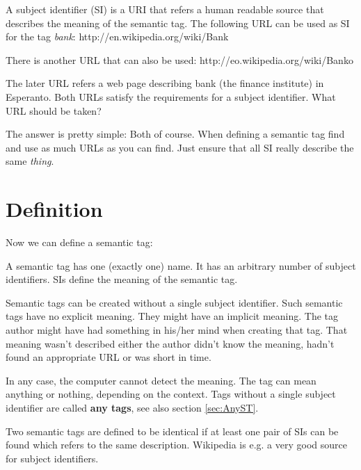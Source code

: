 A subject identifier (SI) is a URI that refers a human readable source that describes the meaning of the semantic tag. The following URL can be used as SI for the tag {\it bank}: http://en.wikipedia.org/wiki/Bank

There is another URL that can also be used:
http://eo.wikipedia.org/wiki/Banko

The later URL refers a web page describing bank (the finance institute) in Esperanto. Both URLs satisfy the requirements for a subject identifier. What URL should be taken?

The answer is pretty simple: Both of course. When defining a semantic tag find and use as much URLs as you can find. Just ensure that all SI really describe the same {\it thing}.

\section{Definition}
Now we can define a semantic tag:

A semantic tag has one (exactly one) name. It has an arbitrary number of subject identifiers. SIs define the meaning of the semantic tag. 

Semantic tags can be created without a single subject identifier. Such semantic tags have no explicit meaning. They might have an implicit meaning. The tag author might have had something in his/her mind when creating that tag. That meaning wasn't described either the author didn't know the meaning, hadn't found an appropriate URL or was short in time.

In any case, the computer cannot detect the meaning. The tag can mean anything or nothing, depending on the context. Tags without a single subject identifier are called {\bf any tags}, see also section \ref{sec:AnyST}.

Two semantic tags are defined to be identical if at least one pair of SIs can be found which refers to the same description. Wikipedia is e.g. a very good source for subject identifiers.

